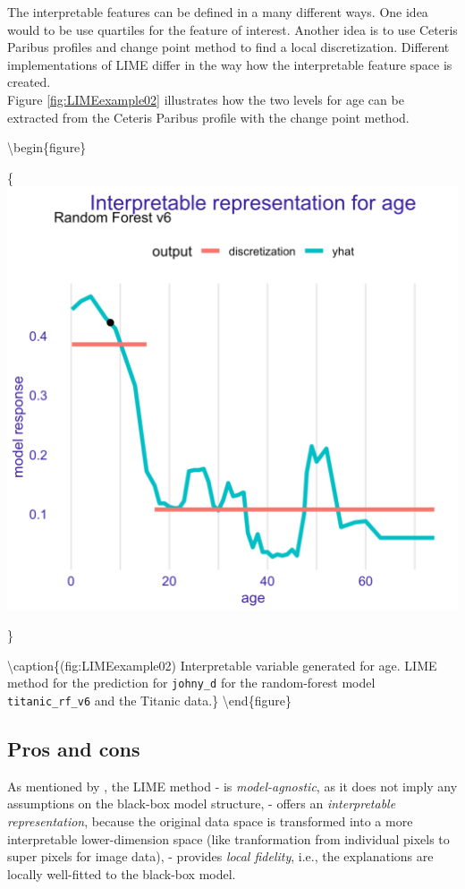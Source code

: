 \documentclass[12pt,]{krantz}
\begin{document}
The interpretable features can be defined in a many different ways. One idea would to be use quartiles for the feature of interest. Another idea is to use Ceteris Paribus profiles and change point method \citep{picard_1985} to find a local discretization. Different implementations of LIME differ in the way how the interpretable feature space is created.\\
Figure \ref{fig:LIMEexample02} illustrates how the two levels for age can be extracted from the Ceteris Paribus profile with the change point method.

\textbackslash{}begin\{figure\}

\{\centering \includegraphics[width=0.6\linewidth]{figure/LIMEexample02}

\}

\textbackslash{}caption\{(fig:LIMEexample02) Interpretable variable generated for age. LIME method for the prediction for \texttt{johny\_d} for the random-forest model \texttt{titanic\_rf\_v6} and the Titanic data.\}\label{fig:LIMEexample02}
\textbackslash{}end\{figure\}

\hypertarget{LIMEProsCons}{%
\subsection{Pros and cons}\label{LIMEProsCons}}

As mentioned by \citep{lime}, the LIME method
- is \emph{model-agnostic}, as it does not imply any assumptions on the black-box model structure,
- offers an \emph{interpretable representation}, because the original data space is transformed into a more interpretable lower-dimension space (like tranformation from individual pixels to super pixels for image data),
- provides \emph{local fidelity}, i.e., the explanations are locally well-fitted to the black-box model.
\end{document}
